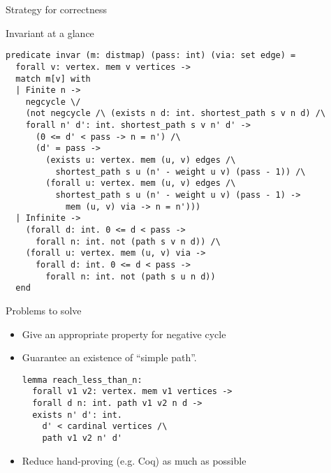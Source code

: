 \documentclass{beamer}
\begin{document}
\begin{frame}{Strategy for correctness}

\vspace*{16pt}


\end{frame}

\begin{frame}[fragile]{Invariant at a glance}
\footnotesize
\begin{lstlisting}[language=why3]
predicate invar (m: distmap) (pass: int) (via: set edge) =
  forall v: vertex. mem v vertices ->
  match m[v] with
  | Finite n ->
    negcycle \/
    (not negcycle /\ (exists n d: int. shortest_path s v n d) /\
    forall n' d': int. shortest_path s v n' d' ->
      (0 <= d' < pass -> n = n') /\
      (d' = pass ->
        (exists u: vertex. mem (u, v) edges /\
          shortest_path s u (n' - weight u v) (pass - 1)) /\
        (forall u: vertex. mem (u, v) edges /\
          shortest_path s u (n' - weight u v) (pass - 1) ->
            mem (u, v) via -> n = n')))
  | Infinite ->
    (forall d: int. 0 <= d < pass ->
      forall n: int. not (path s v n d)) /\
    (forall u: vertex. mem (u, v) via ->
      forall d: int. 0 <= d < pass ->
        forall n: int. not (path s u n d))
  end
\end{lstlisting}
\end{frame}


\begin{frame}[fragile]{Problems to solve}

\begin{itemize}

\item Give an appropriate property for negative cycle

\item Guarantee an existence of ``simple path''.

\begin{lstlisting}[language=why3]
lemma reach_less_than_n:
  forall v1 v2: vertex. mem v1 vertices ->
  forall d n: int. path v1 v2 n d ->
  exists n' d': int.
    d' < cardinal vertices /\
    path v1 v2 n' d'
\end{lstlisting}

\item Reduce hand-proving (e.g. Coq) as much as possible

\end{itemize}
\end{frame}
\end{document}
